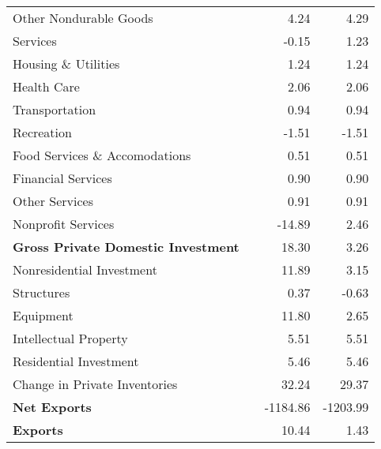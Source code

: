 \documentclass[11pt, letterpaper]{article}\usepackage[]{graphicx}\usepackage[]{color}
\begin{document}
\begin{table}[H]
\begin{tabular}{lrrr}
  \hspace{24mm}  Other Nondurable Goods &  & 4.24 & 4.29 \\ 
  \hspace{8mm}  Services &  & -0.15 & 1.23 \\ 
  \hspace{16mm}  Housing \& Utilities &  & 1.24 & 1.24 \\ 
  \hspace{16mm}  Health Care &  & 2.06 & 2.06 \\ 
  \hspace{16mm}  Transportation &  & 0.94 & 0.94 \\ 
  \hspace{16mm}  Recreation &  & -1.51 & -1.51 \\ 
  \hspace{16mm}  Food Services \& Accomodations &  & 0.51 & 0.51 \\ 
  \hspace{16mm}  Financial Services &  & 0.90 & 0.90 \\ 
  \hspace{16mm}  Other Services &  & 0.91 & 0.91 \\ 
  \hspace{16mm}  Nonprofit Services &  & -14.89 & 2.46 \\ 
  \hspace{0mm} \textbf{Gross Private Domestic Investment} &  & 18.30 & 3.26 \\ 
  \hspace{8mm}  Nonresidential Investment &  & 11.89 & 3.15 \\ 
  \hspace{16mm}  Structures &  & 0.37 & -0.63 \\ 
  \hspace{16mm}  Equipment &  & 11.80 & 2.65 \\ 
  \hspace{16mm}  Intellectual Property &  & 5.51 & 5.51 \\ 
  \hspace{8mm}  Residential Investment &  & 5.46 & 5.46 \\ 
  \hspace{8mm}  Change in Private Inventories &  & 32.24 & 29.37 \\ 
  \hspace{0mm} \textbf{Net Exports} &  & -1184.86 & -1203.99 \\ 
  \hspace{0mm} \textbf{Exports} &  & 10.44 & 1.43 \\ 

\end{tabular}
\end{table}
\end{document}
